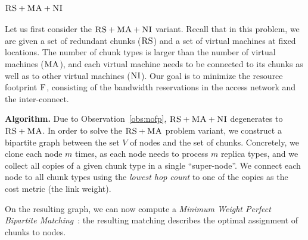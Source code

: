 \documentclass[9pt]{sigcomm-alternate}
\newcommand{\MaFactor}{m}
\newcommand{\ChunkType}{\tau}
\newcommand{\VirtualNodes}{\ensuremath{V}}
\newcommand{\CC}{\textsc{NI}}
\newcommand{\RS}{\textsc{RS}}
\newcommand{\MA}{\textsc{MA}}
\newcommand{\Cost}{\textsc{F}}
\begin{document}
\subsubsection{$\RS+\MA+\CC$}

Let us first consider the $\RS+\MA+\CC$ variant.
Recall that in this problem,
we are given a set of redundant chunks ($\RS$) and a set of virtual machines
at fixed locations. The number of chunk types is larger than the number
of virtual machines ($\MA$), and each virtual machine needs to be connected
to its chunks as well as to other virtual machines ($\CC$).
Our goal is to minimize the resource footprint $\Cost$, consisting
of the bandwidth reservations in the access network and the inter-connect.

\textbf{Algorithm.} Due to Observation~\ref{obs:nofp}, $\RS+\MA+\CC$ degenerates to $\RS+\MA$.
In order to solve the $\RS+\MA$ problem variant,
we construct a bipartite
graph between the set
$\VirtualNodes$ of nodes and
the set of chunks.
Concretely, we clone each node $\MaFactor$ times,
as each node needs to process
$\MaFactor$ replica types, and we collect all copies of a given chunk type in a
single %
``super-node''. We connect each node to all chunk types using the
\emph{lowest hop count} to one of the copies as the cost metric (the link weight).

On the resulting graph, we can now compute a \emph{Minimum Weight
Perfect Bipartite
Matching}~\cite{gabow_scaling_algorithm}:
the resulting matching describes the optimal assignment of chunks to nodes.

\end{document}

